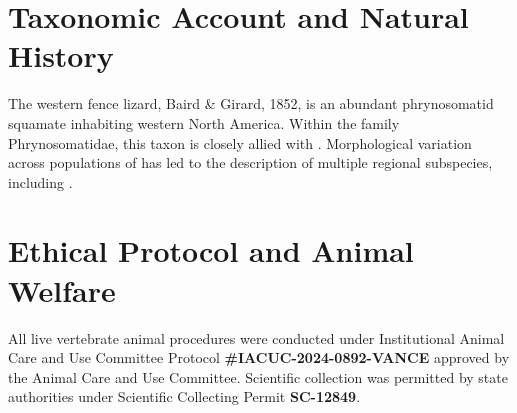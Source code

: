 
\section{Taxonomic Account and Natural History}

The western fence lizard,  Baird \& Girard, 1852, 
is an abundant phrynosomatid squamate inhabiting western North America. Within 
the family Phrynosomatidae, this taxon is closely allied with . 
Morphological variation across populations of  has led to 
the description of multiple regional subspecies, including .

\section{Ethical Protocol and Animal Welfare}

All live vertebrate animal procedures were conducted under Institutional Animal 
Care and Use Committee Protocol \textbf{\#IACUC-2024-0892-VANCE} approved by the 
Animal Care and Use Committee. Scientific collection was permitted by state authorities 
under Scientific Collecting Permit \textbf{SC-12849}.
